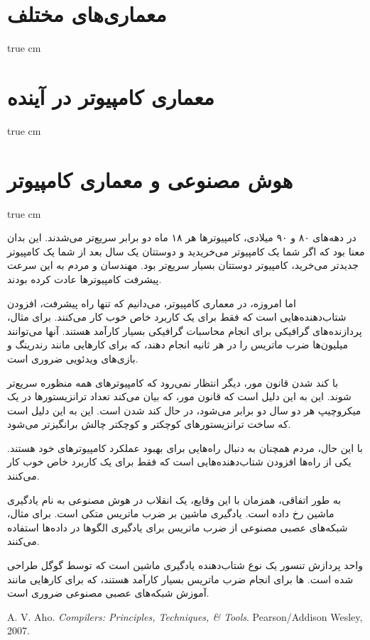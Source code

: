 \documentclass[11pt, twoside]{imsproc}
\let\LTRfootnote\footnoteA
\begin{document}
\section{معماری‌‌های مختلف}
 true cm

\section{معماری کامپیوتر در آینده}
 true cm

\section{هوش مصنوعی و معماری کامپیوتر}
 true cm

در دهه‌های ۸۰ و ۹۰ میلادی، کامپیوترها هر ۱۸ ماه دو برابر سریع‌تر می‌شدند. این بدان معنا بود که اگر شما یک کامپیوتر می‌خریدید و دوستتان یک سال بعد از شما یک کامپیوتر جدیدتر می‌خرید، کامپیوتر دوستتان بسیار سریع‌تر بود. مهندسان و مردم به این سرعت پیشرفت کامپیوترها عادت کرده بودند.

اما امروزه، در معماری کامپیوتر، می‌دانیم که تنها راه پیشرفت، افزودن شتاب‌دهنده‌هایی است که فقط برای یک کاربرد خاص خوب کار می‌کنند. برای مثال، پردازنده‌های گرافیکی\LTRfootnote{\lr{GPU}} برای انجام محاسبات گرافیکی بسیار کارآمد هستند. آنها می‌توانند میلیون‌ها ضرب ماتریس را در هر ثانیه انجام دهند، که برای کارهایی مانند رندرینگ  و بازی‌های ویدئویی ضروری است.

با کند شدن قانون مور، دیگر انتظار نمی‌رود که کامپیوترهای همه منظوره سریع‌تر شوند. این به این دلیل است که قانون مور، که بیان می‌کند تعداد ترانزیستورها در یک میکروچیپ هر دو سال دو برابر می‌شود، در حال کند شدن است. این به این دلیل است که ساخت ترانزیستورهای کوچکتر و کوچکتر چالش برانگیزتر می‌شود.

با این حال، مردم همچنان به دنبال راه‌هایی برای بهبود عملکرد کامپیوترهای خود هستند. یکی از راه‌ها افزودن شتاب‌دهنده‌هایی است که فقط برای یک کاربرد خاص خوب کار می‌کنند.

به طور اتفاقی، همزمان با این وقایع، یک انقلاب در هوش مصنوعی به نام یادگیری ماشین رخ داده است. یادگیری ماشین بر ضرب ماتریس متکی است. برای مثال، شبکه‌های عصبی مصنوعی  از ضرب ماتریس برای یادگیری الگوها در داده‌ها استفاده می‌کنند.

واحد پردازش تنسور  یک نوع شتاب‌دهنده یادگیری ماشین است که توسط گوگل طراحی شده است. ها برای انجام ضرب ماتریس بسیار کارآمد هستند، که برای کارهایی مانند آموزش شبکه‌های عصبی مصنوعی  ضروری است.

\begin{thebibliography}{99}%
\begin{LTRbibitems}
\resetlatinfont

A. V. Aho. \emph{Compilers: Principles, Techniques, \& Tools}. Pearson/Addison Wesley, 2007.
\end{LTRbibitems}
\end{thebibliography}
\end{document}
